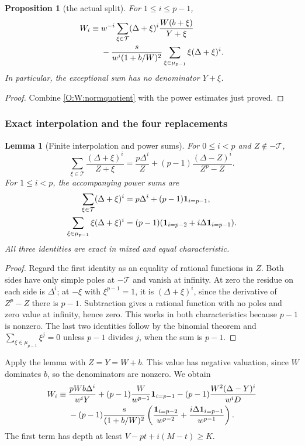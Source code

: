 \documentclass[11pt]{amsart}
\newtheorem{proposition}[theorem]{Proposition}
\newtheorem{lemma}[theorem]{Lemma}
\theoremstyle{definition}
\theoremstyle{remark}
\begin{document}
\begin{proposition}[the actual split]\label{O:W:split}
For $1\le i\le p-1$,
\begin{align}\label{O:W:Wsplit}
 W_i\equiv{}&w^{-i}\sum_{\xi\in\mathcal T}
 (\Delta+\xi)^i\frac{W(b+\xi)}{Y+\xi}\notag\\
 &-\frac{s}{w^i(1+b/W)^2}
       \sum_{\xi\in\mu_{p-1}}\xi(\Delta+\xi)^i .
\end{align}
In particular, the exceptional sum has no denominator $Y+\xi$.
\end{proposition}
\begin{proof}
Combine \eqref{O:W:normquotient} with the power estimates just proved.
\end{proof}

\subsubsection*{Exact interpolation and the four replacements}
\begin{lemma}[Finite interpolation and power sums]\label{O:D:interpolation}
For $0\le i<p$ and $Z\notin-\mathcal T$,
\[
 \sum_{\xi\in\mathcal T}\frac{(\Delta+\xi)^i}{Z+\xi}
 =\frac{p\Delta^i}{Z}+(p-1)\frac{(\Delta-Z)^i}{Z^p-Z}.
\]
For $1\le i<p$, the accompanying power sums are
\begin{align*}
 \sum_{\xi\in\mathcal T}(\Delta+\xi)^i
 &=p\Delta^i+(p-1)\mathbf1_{i=p-1},\\
 \sum_{\xi\in\mu_{p-1}}\xi(\Delta+\xi)^i
 &=(p-1)(\mathbf1_{i=p-2}+i\Delta\mathbf1_{i=p-1}).
\end{align*}
All three identities are exact in mixed and equal characteristic.
\end{lemma}
\begin{proof}
Regard the first identity as an equality of rational functions in $Z$.
Both sides have only simple poles at $-\mathcal T$ and vanish at infinity.
At zero the residue on each side is $\Delta^i$; at $-\xi$ with
$\xi^{p-1}=1$, it is $(\Delta+\xi)^i$, since the derivative of
$Z^p-Z$ there is $p-1$. Subtraction gives a rational function with no
poles and zero value at infinity, hence zero. This works in both
characteristics because $p-1$ is nonzero. The last two identities follow
by the binomial theorem and
$\sum_{\xi\in\mu_{p-1}}\xi^j=0$ unless $p-1$ divides $j$, when the
sum is $p-1$.
\end{proof}

Apply the lemma with $Z=Y=W+b$. This value has negative valuation,
since $W$ dominates $b$, so the denominators are nonzero. We obtain
\begin{align}\label{O:W:Wpre}
 W_i\equiv{}&\frac{pWb\Delta^i}{w^iY}
 +(p-1)\frac{W}{w^{p-1}}\mathbf1_{i=p-1}
 -(p-1)\frac{W^2(\Delta-Y)^i}{w^iD}\notag\\
 &-(p-1)\frac{s}{(1+b/W)^2}
 \left(\frac{\mathbf1_{i=p-2}}{w^{p-2}}
       +\frac{i\Delta\mathbf1_{i=p-1}}{w^{p-1}}\right).
\end{align}
The first term has depth at least $V-pt+i(M-t)\ge K$.
\end{document}
